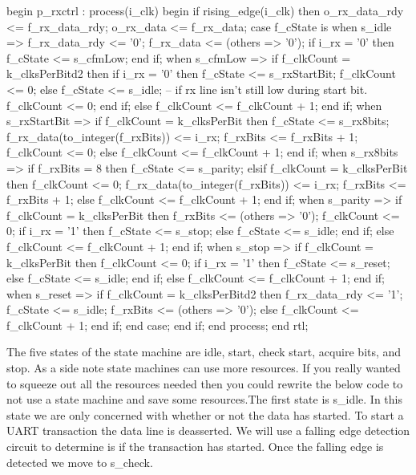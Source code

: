 \begin{VHDLlisting}[tabsize=8]
begin
  p_rxctrl : process(i_clk) 
  begin
    if rising_edge(i_clk) then
      o_rx_data_rdy <= f_rx_data_rdy;
      o_rx_data <= f_rx_data;
      case f_cState is
        when s_idle => 
          f_rx_data_rdy <= '0';
          f_rx_data <= (others => '0');
          if i_rx = '0' then
            f_cState <= s_cfmLow;
          end if;
        when s_cfmLow =>
          if f_clkCount = k_clksPerBitd2 then
            if i_rx = '0' then
              f_cState <= s_rxStartBit;
              f_clkCount <= 0;  
            else 
              f_cState <= s_idle; -- if rx line isn't still low during start bit.
              f_clkCount <= 0;
            end if;
          else
            f_clkCount <= f_clkCount + 1;
          end if;
        when s_rxStartBit =>
          if f_clkCount = k_clksPerBit then
            f_cState <= s_rx8bits;
            f_rx_data(to_integer(f_rxBits)) <= i_rx;
            f_rxBits <= f_rxBits + 1;
            f_clkCount <= 0;
          else 
            f_clkCount <= f_clkCount + 1;
          end if;        
        when s_rx8bits =>
          if f_rxBits = 8 then
            f_cState <= s_parity;
          elsif f_clkCount = k_clksPerBit then 
            f_clkCount <= 0;
            f_rx_data(to_integer(f_rxBits)) <= i_rx;
            f_rxBits <= f_rxBits + 1;
          else 
            f_clkCount <= f_clkCount + 1;
          end if;
        when s_parity =>
          if f_clkCount = k_clksPerBit then
            f_rxBits <= (others => '0');
            f_clkCount <= 0;
            if i_rx = '1' then
              f_cState <= s_stop;
            else
              f_cState <= s_idle;
            end if;
          else
            f_clkCount <= f_clkCount + 1;
          end if;
        when s_stop => 
          if f_clkCount = k_clksPerBit then
            f_clkCount <= 0;
            if i_rx = '1' then
              f_cState <= s_reset;
            else
              f_cState <= s_idle;
            end if;
          else
            f_clkCount <= f_clkCount + 1;
          end if;
        when s_reset =>
          if f_clkCount = k_clksPerBitd2 then
            f_rx_data_rdy <= '1';
            f_cState <= s_idle;
            f_rxBits <= (others => '0');
          else
            f_clkCount <= f_clkCount + 1;
          end if;
      end case; 
    end if;
  end process;
end rtl;
\end{VHDLlisting}

The five states of the state machine are idle, start, check start, acquire bits, and stop. As a side note state machines can use more resources. If you really wanted to squeeze out all the resources needed then you could rewrite the below code to not use a state machine and save some resources.The first state is s\_idle. In this state we are only concerned with whether or not the data has started. To start a UART transaction the data line is deasserted. We will use a falling edge detection circuit to determine is if the transaction has started. Once the falling edge is detected we move to s\_check.

